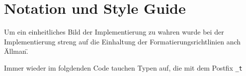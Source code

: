 \section{Notation und Style Guide}
Um ein einheitliches Bild der Implementierung zu wahren wurde bei der Implementierung streng auf die Einhaltung der Formatierungsrichtlinien anch \"Allman\".

Immer wieder im folgdenden Code tauchen Typen auf, die mit dem Postfix \texttt{\_t} 